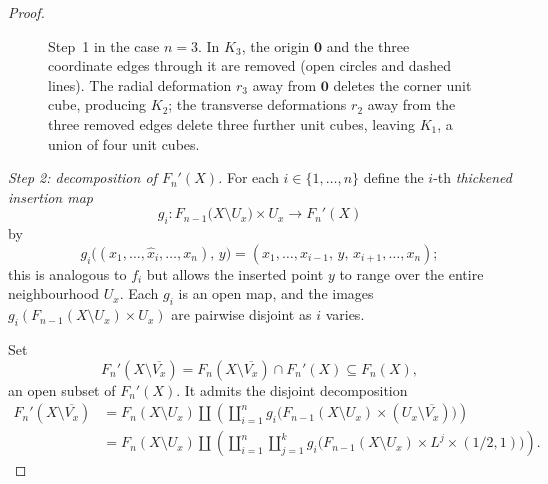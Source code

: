 \documentclass[reqno]{amsart}
\theoremstyle{definition}
\numberwithin{equation}{section}
\begin{document}
\begin{proof}
\begin{figure}[ht]
\caption{Step~1 in the case \(n=3\). In \(K_3\), the origin
\(\mathbf0\) and the three coordinate edges through it are
removed (open circles and dashed lines). The radial deformation
\(r_3\) away from \(\mathbf0\) deletes the corner unit cube,
producing \(K_2\); the transverse deformations \(r_2\) away
from the three removed edges delete three further unit cubes,
leaving \(K_1\), a union of four unit cubes.}
\label{fig:K1-cube}
\end{figure}

\smallskip
\noindent\emph{Step 2: decomposition of \(F_n'(X)\).}
For each \(i\in\{1,\dots,n\}\) define the \(i\)-th
\emph{thickened insertion map}
\[
g_i\colon F_{n-1}\bigl(X\setminus U_x\bigr)
\times U_x \longrightarrow F_n'(X)
\]
by
\[
g_i\bigl((x_1,\dots,\hat{x}_i,\dots,x_n),\,y\bigr)
=
(x_1,\dots,x_{i-1},\,y,\,x_{i+1},\dots,x_n);
\]
this is analogous to \(f_i\) but allows the inserted point \(y\) to
range over the entire neighbourhood \(U_x\). Each \(g_i\) is an open
map, and the images \(g_i(F_{n-1}(X\setminus U_x)\times U_x)\) are
pairwise disjoint as \(i\) varies.

Set
\[
F_n'(X\setminus \overline{V_x})
=
F_n(X\setminus \overline{V_x})\cap F_n'(X)
\subseteq F_n(X),
\]
an open subset of \(F_n'(X)\). It admits the disjoint decomposition
\begin{align*}
F_n'(X\setminus \overline{V_x})
&=
F_n(X\setminus U_x)
\coprod
\left(\coprod_{i=1}^n g_i\bigl(F_{n-1}(X\setminus U_x)
\times (U_x\setminus \overline{V_x})\bigr)\right) \\
&=
F_n(X\setminus U_x)
\coprod
\left(\coprod_{i=1}^n\coprod_{j=1}^k
g_i\bigl(F_{n-1}(X\setminus U_x)\times L^j\times(1/2,1)\bigr)\right).
\end{align*}


\end{proof}
\end{document}
